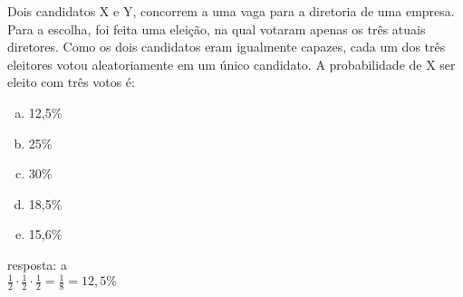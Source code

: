 \begin{ex}
Dois candidatos X e Y, concorrem a uma vaga para a diretoria de uma empresa. Para a escolha, foi feita uma eleição, na qual votaram apenas os três atuais diretores. Como os dois candidatos eram igualmente capazes, cada um dos três eleitores votou aleatoriamente em um único candidato. A probabilidade de X ser eleito com três votos é:
   \begin{enumerate}[(a)]
   \item 12,5\%
   \item 25\%
   \item 30\%
   \item 18,5\%
   \item 15,6\%
   \end{enumerate}
     \begin{sol}
      resposta: a \\
      $\frac{1}{2}\cdot\frac{1}{2}\cdot\frac{1}{2}=\frac{1}{8}=12,5\%$
     \end{sol}
\end{ex}